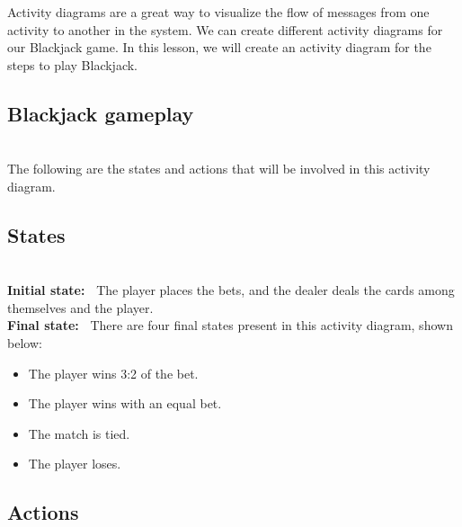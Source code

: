 

Activity diagrams are a great way to visualize the flow of messages from one activity to another in the system. We can create different activity diagrams for our Blackjack game. In this lesson, we will create an activity diagram for the steps to play Blackjack.

\subsection{Blackjack gameplay}\label{kWi-3jovD6LcTSdvb1CmH}
\\
The following are the states and actions that will be involved in this activity diagram.

\subsection{States}\label{o95UVBwlh6HPZvVb2DP4M}
\\
\textbf{Initial state:~} The player places the bets, and the dealer deals the cards among themselves and the player.
\\
\textbf{Final state:~} There are four final states present in this activity diagram, shown below:

\begin{itemize}
\item
\protect{}\label{tQh8PDXnLfSyeOR8zKR2R}
The player wins 3:2 of the bet.
\item
\protect{}\label{3F_qZZtZ-xDHISz1cP6OK}
The player wins with an equal bet.
\item
\protect{}\label{fDQDigqsyo3yvaR49fdij}
The match is tied.
\item
\protect{}\label{2fDAzHBdxDfcdawWMa0uP}
The player loses.
\end{itemize}

\subsection{Actions}\label{SxV7h0mgojRX29uIarsjb}


